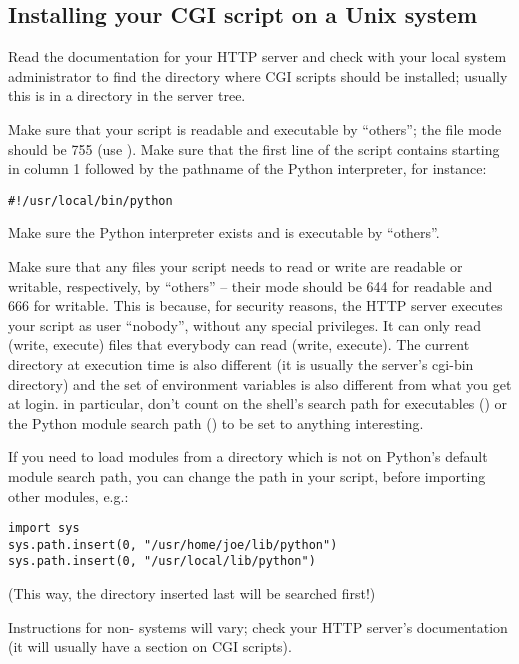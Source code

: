 \subsection{Installing your CGI script on a Unix system}

Read the documentation for your HTTP server and check with your local
system administrator to find the directory where CGI scripts should be
installed; usually this is in a directory  in the server tree.

Make sure that your script is readable and executable by ``others''; the
\UNIX{} file mode should be 755 (use ).  Make sure
that the first line of the script contains \code{\#!} starting in column 1
followed by the pathname of the Python interpreter, for instance:

\bcode\begin{verbatim}
#!/usr/local/bin/python
\end{verbatim}\ecode
%
Make sure the Python interpreter exists and is executable by ``others''.

Make sure that any files your script needs to read or write are
readable or writable, respectively, by ``others'' -- their mode should
be 644 for readable and 666 for writable.  This is because, for
security reasons, the HTTP server executes your script as user
``nobody'', without any special privileges.  It can only read (write,
execute) files that everybody can read (write, execute).  The current
directory at execution time is also different (it is usually the
server's cgi-bin directory) and the set of environment variables is
also different from what you get at login.  in particular, don't count
on the shell's search path for executables () or the Python
module search path () to be set to anything interesting.

If you need to load modules from a directory which is not on Python's
default module search path, you can change the path in your script,
before importing other modules, e.g.:

\bcode\begin{verbatim}
import sys
sys.path.insert(0, "/usr/home/joe/lib/python")
sys.path.insert(0, "/usr/local/lib/python")
\end{verbatim}\ecode
%
(This way, the directory inserted last will be searched first!)

Instructions for non-\UNIX{} systems will vary; check your HTTP server's
documentation (it will usually have a section on CGI scripts).



